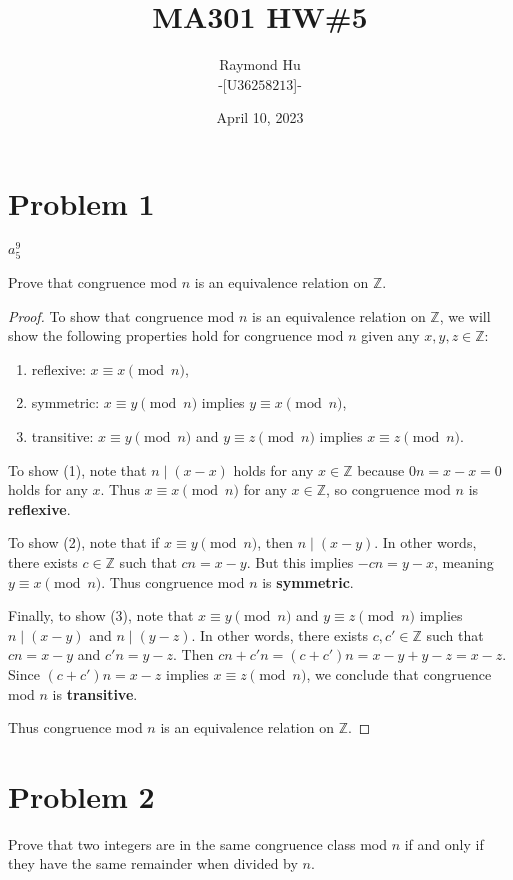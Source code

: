 \documentclass[12pt]{article}
\title{MA301 HW\#5}
\author{Raymond Hu\\[1ex]\normalsize-[U\(36258213\)]-}
\date{April 10, 2023}
\newcommand{\Z}{\mathbb{Z}}
\theoremstyle{definition}
\begin{document}
\maketitle

\doublespacing

\section*{Problem 1}
\(a_5 ^9 \)


Prove that congruence mod \(n\) is an equivalence relation on \(\Z\).
\begin{proof}
    To show that congruence mod \(n\) is an equivalence relation on \(\Z\), we will show the following properties hold for congruence mod \(n\) given any \(x,y,z\in\Z\):
    \begin{enumerate}[label = (\arabic*)]
        \item reflexive: \(x\equiv x\pmod{n}\),
        \item symmetric: \(x\equiv y\pmod{n}\) implies \(y\equiv x\pmod{n}\),
        \item transitive: \(x\equiv y\pmod{n}\) and \(y\equiv z\pmod{n}\) implies \(x\equiv z\pmod{n}\).
    \end{enumerate}
    To show (1), note that \(n\mid (x-x)\) holds for any \(x\in\Z\) because \(0n = x-x = 0\) holds for any \(x\). Thus \(x\equiv x\pmod{n}\) for any \(x\in\Z\), so congruence mod \(n\) is \textbf{reflexive}. 

    To show (2), note that if \(x\equiv y\pmod{n}\), then \(n\mid (x-y)\). In other words, there exists \(c\in\Z\) such that \(cn = x-y\). But this implies \(-cn = y-x\), meaning \(y\equiv x\pmod{n}\). Thus congruence mod \(n\) is \textbf{symmetric}.

    Finally, to show (3), note that \(x\equiv y\pmod{n}\) and \(y\equiv z\pmod{n}\) implies \(n\mid (x-y)\) and \(n\mid (y-z)\). In other words, there exists \(c, c'\in\Z\) such that \(cn = x-y\) and \(c'n = y-z\). Then \(cn + c'n = (c+c')n = x-y + y-z = x-z\). Since \((c+c')n = x-z\) implies \(x\equiv z\pmod{n}\), we conclude that congruence mod \(n\) is \textbf{transitive}.

    Thus congruence mod \(n\) is an equivalence relation on \(\Z\).
\end{proof}

\section*{Problem 2}
Prove that two integers are in the same congruence class mod \(n\) if and only if they have the same
remainder when divided by \(n\).
\end{document}
